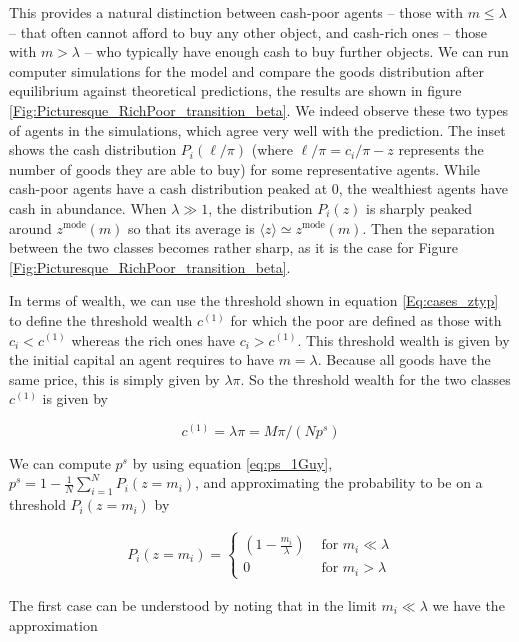 This provides a natural distinction between cash-poor agents -- those with $m \leq \lambda$ --  that often cannot afford to buy any other object, and cash-rich ones -- those with $m> \lambda$ --  who typically have enough cash to buy further objects. We can run computer simulations for the model and compare the goods distribution after equilibrium against theoretical predictions, the results are shown in figure \ref{Fig:Picturesque_RichPoor_transition_beta}. We indeed observe these two types of agents in the simulations, which agree very well with the prediction. The inset shows the cash distribution $P_i(\ell/\pi)$ (where $\ell/\pi = c_i/\pi - z$ represents the number of goods they are able to buy) for some representative agents. While cash-poor agents have a cash distribution peaked at $0$, the wealthiest agents have cash in abundance. When $\lambda\gg 1$, the distribution $P_i(z)$ is sharply peaked around $z^{\text{mode}}(m)$ so that its average is $\langle z\rangle\simeq z^{\text{mode}}(m)$. Then the separation between the two classes becomes rather sharp, as it is the case for Figure \ref{Fig:Picturesque_RichPoor_transition_beta}.

In terms of wealth, we can use the threshold shown in equation \eqref{Eq:cases_ztyp} to define the threshold wealth $c^{(1)}$ for which the poor are defined as those with $c_i<c^{(1)}$ whereas the rich ones have $c_i>c^{(1)}$. This threshold wealth is given by the initial capital an agent requires to have $m = \lambda$. Because all goods have the same price, this is simply given by $\lambda \pi$. So the threshold wealth for the two classes $c^{(1)}$ is given by

\begin{equation}
c^{(1)} = \lambda \pi = M \pi/(N p^s)
\label{eq:c1}
\end{equation}

We can compute $p^s$ by using equation \eqref{eq:ps_1Guy}, $p^s = 1 - \frac{1}{N} \sum_{i=1}^{N} P_i(z = m_i)$, and approximating the probability to be on a threshold $P_i(z=m_i)$ by

\begin{align}
P_i(z=m_i) = 
\begin{cases}
\left( 1 - \frac{m_i}{\lambda} \right) & \text{ for } m_i \ll \lambda \\
0 & \text{ for } m_i > \lambda
\end{cases}
\label{eq:k1_saturated_prob}
\end{align}

The first case can be understood by noting that in the limit $m_i \ll \lambda$ we have the approximation

